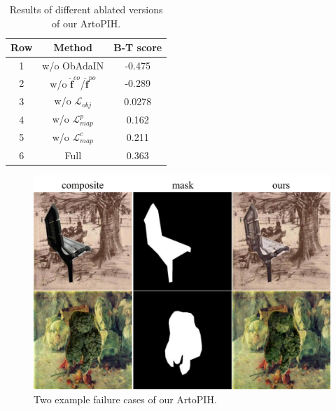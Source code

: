 \documentclass[letterpaper]{article} %
\begin{document}
\begin{table}[t] 
\centering
\begin{tabular}{c|c|c}
\hline
Row & Method  & B-T score \\
\hline
1 &  w/o ObAdaIN &  -0.475\\
2 & w/o $\hat{\bm{f}}^{co}$/$\hat{\bm{f}}^{po}$  & -0.289\\
3 & w/o $\mathcal{L}_{obj}$  & 0.0278\\
4 & w/o $\mathcal{L}_{map}^p$   & 0.162 \\
5 & w/o $\mathcal{L}_{map}^c$  & 0.211 \\
6 & Full  & 0.363 \\
\hline
\end{tabular}
\caption{Results of different ablated versions of our ArtoPIH. }
\label{tab:ablation}
\end{table}

\begin{figure}[t]
\centering
\includegraphics[width=0.8\linewidth]{figures/failure_cases.jpg}
\caption{Two example failure cases of our ArtoPIH.}
\label{fig:failure_cases}
\end{figure}
\end{document}
